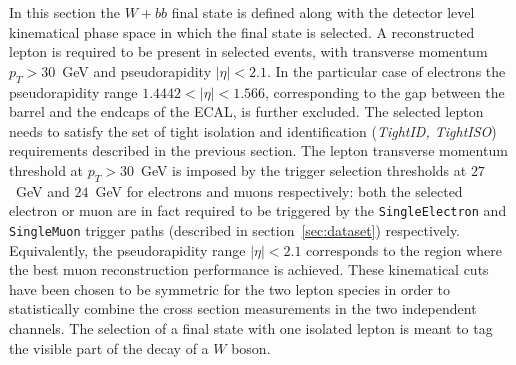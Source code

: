 In this section the $W + bb$ final state is 
defined along with the detector level kinematical 
phase space in which the final state is selected.
A reconstructed lepton is required to be present 
in selected events, with transverse momentum $p_{T} > 30$~GeV 
and pseudorapidity $|\eta| < 2.1$. In the particular case of electrons 
the pseudorapidity range $1.4442 < |\eta| < 1.566$, corresponding 
to the gap between the barrel and the endcaps of the ECAL, is 
further excluded. The selected lepton needs to satisfy the set of 
tight isolation and identification (\textit{TightID, TightISO}) 
requirements described in the previous section.
The lepton transverse momentum threshold at $p_{T} > 30$~GeV is imposed by 
the trigger selection thresholds at $27$~GeV and $24$~GeV for electrons and 
muons respectively: both the selected electron or muon are in fact 
required to be triggered by the \texttt{SingleElectron} and 
\texttt{SingleMuon} trigger paths (described in section~\ref{sec:dataset})
respectively.
Equivalently, the pseudorapidity range $|\eta| < 2.1$ corresponds to the 
region where the best muon reconstruction performance is achieved.
These kinematical cuts have been chosen to be symmetric for the two lepton 
species in order to statistically combine the cross 
section measurements in the two independent channels.
The selection of a final state with one isolated lepton is meant to tag the 
visible part of the decay of a $W$ boson.


